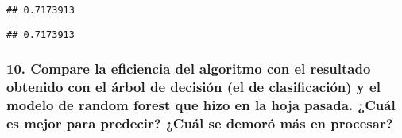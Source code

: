 \documentclass[
]{article}
\newenvironment{Shaded}{\begin{snugshade}}{\end{snugshade}}
\newcommand{\AttributeTok}[1]{\textcolor[rgb]{0.77,0.63,0.00}{#1}}
\newcommand{\CommentTok}[1]{\textcolor[rgb]{0.56,0.35,0.01}{\textit{#1}}}
\newcommand{\DecValTok}[1]{\textcolor[rgb]{0.00,0.00,0.81}{#1}}
\newcommand{\FunctionTok}[1]{\textcolor[rgb]{0.00,0.00,0.00}{#1}}
\newcommand{\NormalTok}[1]{#1}
\newcommand{\OtherTok}[1]{\textcolor[rgb]{0.56,0.35,0.01}{#1}}
\newcommand{\SpecialCharTok}[1]{\textcolor[rgb]{0.00,0.00,0.00}{#1}}
\newcommand{\StringTok}[1]{\textcolor[rgb]{0.31,0.60,0.02}{#1}}
\begin{document}
\begin{verbatim}
## 0.7173913
\end{verbatim}

\begin{Shaded}
\end{Shaded}

\begin{verbatim}
## 0.7173913
\end{verbatim}

\hypertarget{compare-la-eficiencia-del-algoritmo-con-el-resultado-obtenido-con-el-uxe1rbol-de-decisiuxf3n-el-de-clasificaciuxf3n-y-el-modelo-de-random-forest-que-hizo-en-la-hoja-pasada.-cuuxe1l-es-mejor-para-predecir-cuuxe1l-se-demoruxf3-muxe1s-en-procesar}{%
\subsubsection{10. Compare la eficiencia del algoritmo con el resultado
obtenido con el árbol de decisión (el de clasificación) y el modelo de
random forest que hizo en la hoja pasada. ¿Cuál es mejor para predecir?
¿Cuál se demoró más en
procesar?}\label{compare-la-eficiencia-del-algoritmo-con-el-resultado-obtenido-con-el-uxe1rbol-de-decisiuxf3n-el-de-clasificaciuxf3n-y-el-modelo-de-random-forest-que-hizo-en-la-hoja-pasada.-cuuxe1l-es-mejor-para-predecir-cuuxe1l-se-demoruxf3-muxe1s-en-procesar}}
\end{document}
